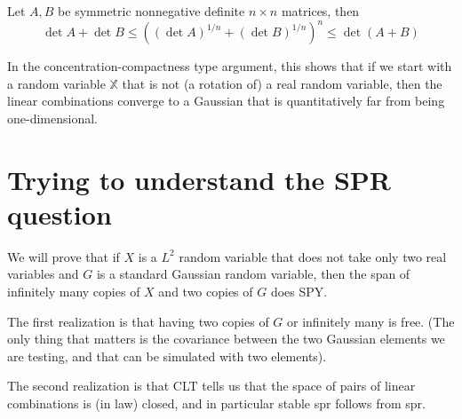 \documentclass{inprogress}
\begin{document}
\begin{lemma} Let $A,B$ be symmetric nonnegative definite $n\times n$ matrices, then
$$
\det A + \det B
\le
\left((\det A)^{1/n}
+
(\det B)^{1/n}\right)^{n}
\le 
\det(A+B)
$$
\end{lemma}

In the concentration-compactness type argument, this shows that if we start with a random variable $\mathbb X$ that is not (a rotation of) a real random variable, then the linear combinations converge to a Gaussian that is quantitatively far from being one-dimensional. 

\section{Trying to understand the SPR question}

We will prove that if $X$ is a $L^2$ random variable that does not take only two real variables and $G$ is a standard Gaussian random variable, then the span of infinitely many copies of $X$ and two copies of $G$ does SPY.

The first realization is that having two copies of $G$ or infinitely many is free. (The only thing that matters is the covariance between the two Gaussian elements we are testing, and that can be simulated with two elements).

The second realization is that CLT tells us that the space of pairs of linear combinations is (in law) closed, and in particular stable spr follows from spr.
\end{document}
